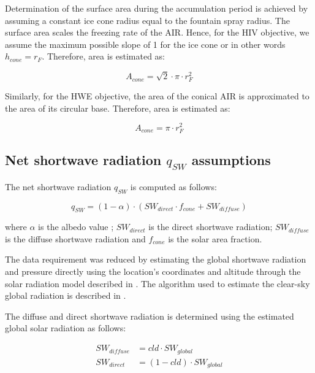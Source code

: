 \documentclass[tc, manuscript]{copernicus}
\begin{document}
Determination of the surface area during the accumulation period is achieved by assuming a constant ice cone
radius equal to the fountain spray radius. The surface area scales the freezing rate of the AIR. Hence, for the
HIV objective, we assume the maximum possible slope of 1 for the ice cone or in other words $h_{cone} = r_{F}$.
Therefore, area is estimated as:  

\begin{equation} A_{cone} =\sqrt{2} \cdot \pi \cdot r_{F}^2  \end{equation}

Similarly, for the HWE objective, the area of the conical AIR is approximated to the area of its circular
base. Therefore, area is estimated as:

\begin{equation} A_{cone} =\pi \cdot r_{F}^2  \end{equation}

\subsection{Net shortwave radiation \texorpdfstring{$q_{SW}$}{Lg} assumptions}
\label{sec:SW}

The net shortwave radiation $q_{SW}$ is computed as follows:

\begin{equation} 
q_{SW} = (1- \alpha) \cdot ( SW_{direct} \cdot f_{cone} + SW_{diffuse})
\label{eqn:SW} 
\end{equation}

where $\alpha$ is the albedo value ; $SW_{direct}$ is the direct shortwave radiation; $SW_{diffuse}$ is the
diffuse shortwave radiation and $f_{cone}$ is the solar area fraction.

The data requirement was reduced by estimating the global shortwave radiation and pressure directly using the
location's coordinates and altitude through the solar radiation model described in
\citet{holmgrenPvlibPythonPython2018}. The algorithm used to estimate the clear-sky global radiation is
described in \citet{ineichenBroadbandSimplifiedVersion2008}.  

The diffuse and direct shortwave radiation is determined using the estimated global solar radiation as follows:

\begin{equation}
\begin{split}
  SW_{diffuse} &= cld \cdot SW_{global}\\
  SW_{direct} &= (1-cld) \cdot SW_{global}
\end{split}
\end{equation}
\end{document}
